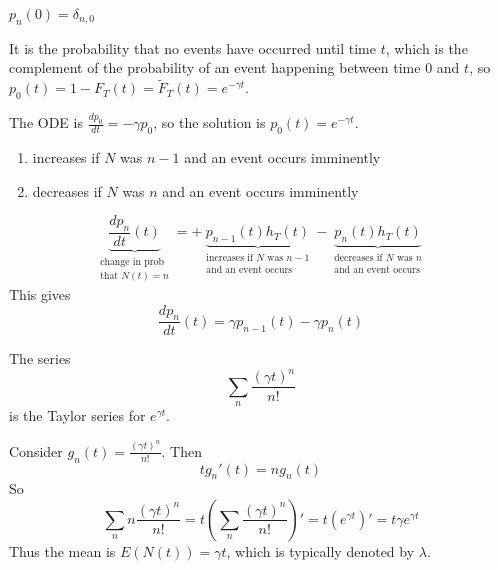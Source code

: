 \begin{solution}
	

\begin{slide}
\begin{parts}
	\item $p_n(0) = \delta_{n,0}$
	\item It is the probability that no events have occurred until time $t$, which is the complement of the probability of an event happening between time $0$ and $t$, so $p_0(t) = 1 - F_T(t) = \tilde{F}_T(t) = e^{-\gamma t}$.

	\item The ODE is $\frac{d p_0}{dt} = -\gamma p_0$, so the solution is $p_0(t) = e^{-\gamma t}$.

	\item 
	\begin{enumerate}
		\item increases if $N$ was $n-1$ and an event occurs imminently
		\item decreases if $N$ was $n$ and an event occurs imminently
	\end{enumerate}
	
	\item 	
	\[ 
		\underbrace{\frac{d p_n}{dt}(t)}_{\substack{\text{change in prob}\\\text{that $N(t)=n$}}}
		 = +\underbrace{p_{n-1}(t) h_T(t)}_{\substack{\text{increases if $N$ was $n-1$}\\\text{and an event occurs}}}
		 -\underbrace{p_{n}(t) h_T(t)}_{\substack{\text{decreases if $N$ was $n$}\\\text{and an event occurs}}}
	\]
	This gives 
	\[ 
		\frac{dp_n}{dt}(t) = \gamma p_{n-1}(t) - \gamma p_n(t)
	\]
	
	\item The series 
	\[ \sum_{n} \frac{(\gamma t)^n}{n!}  \]
	is the Taylor series for $e^{\gamma t}$.
	
	\item Consider $g_n(t) = \frac{(\gamma t)^n}{n!}$. Then
	\[t g_n'(t) = n g_n(t)\]
	So
	\[ \sum_n n \frac{(\gamma t)^n}{n!} 
		= t \left( \sum_n \frac{(\gamma t)^n}{n!}\right)'
		= t \left( e^{\gamma t} \right)'
		= t \gamma e^{\gamma t} \]
	Thus the mean is $E(N(t)) = \gamma t$, which is typically denoted by $\lambda$.

\end{parts}
	
\end{slide}
\end{solution}


